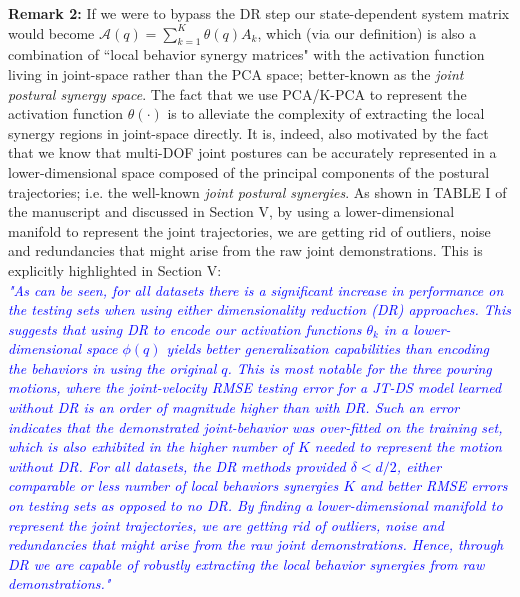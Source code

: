 \documentclass{article}
\begin{document}
\begin{enumerate}
\noindent \textbf{Remark 2:} If we were to bypass the DR step our state-dependent system matrix would become $\mathcal{A}(q)= \sum\limits_{k=1}^{K}\theta(q)A_k$, which (via our definition) is also a combination of ``local behavior synergy matrices" with the activation function living in joint-space rather than the PCA space; better-known as the \textit{joint postural synergy space}. The fact that we use PCA/K-PCA to represent the activation function $\theta(\cdot)$ is to alleviate the complexity of extracting the local synergy regions in joint-space directly. It is, indeed, also motivated by the fact that we know that multi-DOF joint postures can be accurately represented in a lower-dimensional space composed of the principal components of the postural trajectories; i.e. the well-known \textit{joint postural synergies}. As shown in TABLE I of the manuscript and discussed in Section V, by using a lower-dimensional manifold to represent the joint trajectories, we are getting rid of outliers, noise and redundancies that might arise from the raw joint demonstrations. This is explicitly highlighted in Section V:\\
\textcolor{blue}{\small \textit{"As can be seen, for all datasets there is a significant increase in performance on the testing sets when using either dimensionality reduction (DR) approaches. This suggests that using DR to encode our activation functions $\theta_k$ in a lower-dimensional space $\phi(q)$ yields better generalization capabilities than encoding the behaviors in using the original $q$. This is most notable for the three pouring motions, where the joint-velocity RMSE testing error for a JT-DS model learned without DR is an order of magnitude higher than with DR. Such an error indicates that the demonstrated joint-behavior was over-fitted on the training set, which is also exhibited in the higher number of $K$ needed to represent the motion without DR. For all datasets, the DR methods provided $\delta < d/2$, either comparable or less number of local behaviors synergies $K$ and better RMSE errors on testing sets as opposed to no DR. By finding a lower-dimensional manifold to represent the joint trajectories, we are getting rid of outliers, noise and redundancies that might arise from the raw joint demonstrations. Hence, through DR we are capable of robustly extracting the local behavior synergies from raw demonstrations."}} \\

\end{enumerate}
\end{document}
